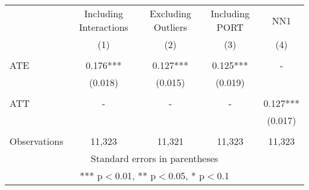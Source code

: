 \documentclass[]{article}
\begin{document}
\begin{tabular}{lcccc} \hline
 & Including Interactions & Excluding Outliers & Including PORT & NN1 \\
 & (1) & (2) & (3) & (4) \\ \hline
 &  &  &  &  \\
ATE & 0.176*** & 0.127*** & 0.125*** & - \\
 & (0.018) & (0.015) & (0.019) &  \\
 &  &  &  &  \\
 ATT & - & - &  - & 0.127*** \\
 &   &  &  & (0.017) \\
 &  &  &  &  \\
 Observations & 11,323 & 11,321 & 11,323 & 11,323 \\ \hline
\multicolumn{5}{c}{ Standard errors in parentheses} \\
\multicolumn{5}{c}{ *** p$<$0.01, ** p$<$0.05, * p$<$0.1} \\
\end{tabular}
\end{document}
